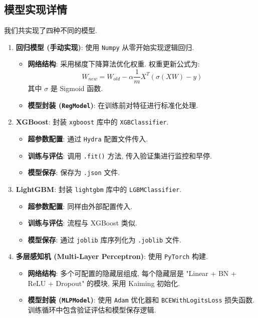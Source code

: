 \documentclass[11pt, a4paper]{article}
\begin{document}
\subsection{模型实现详情}
我们共实现了四种不同的模型.
\begin{enumerate}
    \item \textbf{回归模型 (手动实现)}: 使用 \texttt{Numpy} 从零开始实现逻辑回归.
    \begin{itemize}
        \item \textbf{网络结构}: 采用梯度下降算法优化权重. 权重更新公式为:
        $$ W_{new} = W_{old} - \alpha \frac{1}{m} X^T(\sigma(XW) - y) $$
        其中 $\sigma$ 是 Sigmoid 函数.
        \item \textbf{模型封装 (\texttt{RegModel})}: 在训练前对特征进行标准化处理.
    \end{itemize}
    
    \item \textbf{XGBoost}: 封装 \texttt{xgboost} 库中的 \texttt{XGBClassifier}.
    \begin{itemize}
        \item \textbf{超参数配置}: 通过 \texttt{Hydra} 配置文件传入.
        \item \textbf{训练与评估}: 调用 \texttt{.fit()} 方法, 传入验证集进行监控和早停.
        \item \textbf{模型保存}: 保存为 \texttt{.json} 文件.
    \end{itemize}
    
    \item \textbf{LightGBM}: 封装 \texttt{lightgbm} 库中的 \texttt{LGBMClassifier}.
    \begin{itemize}
        \item \textbf{超参数配置}: 同样由外部配置传入.
        \item \textbf{训练与评估}: 流程与 XGBoost 类似.
        \item \textbf{模型保存}: 通过 \texttt{joblib} 库序列化为 \texttt{.joblib} 文件.
    \end{itemize}

    \item \textbf{多层感知机 (Multi-Layer Perceptron)}: 使用 \texttt{PyTorch} 构建.
    \begin{itemize}
        \item \textbf{网络结构}: 多个可配置的隐藏层组成, 每个隐藏层是 "Linear + BN + ReLU + Dropout" 的模块, 采用 Kaiming 初始化.
        \item \textbf{模型封装 (\texttt{MLPModel})}: 使用 \texttt{Adam} 优化器和 \texttt{BCEWithLogitsLoss} 损失函数. 训练循环中包含验证评估和模型保存逻辑.
    \end{itemize}
\end{enumerate}
\end{document}
